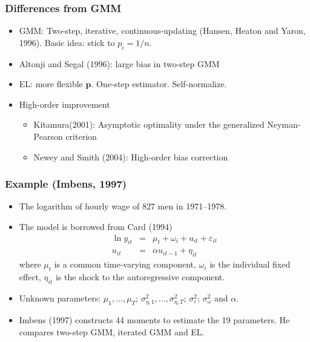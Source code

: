 \documentclass{beamer}
\begin{document}
\begin{frame}
\frametitle{Differences from GMM}
\begin{itemize}
\item GMM: Two-step,
iterative, continuous-updating (Hansen, Heaton and Yaron, 1996).
Basic idea: stick to \(p_i = 1/n\).
\item Altonji and Segal (1996): large bias in two-step GMM
\item EL: more flexible \(\mathbf{p}\). One-step estimator. Self-normalize. 
\item High-order improvement
\begin{itemize}
\item Kitamura(2001): Asymptotic optimality under the generalized Neyman-Pearson criterion
\item Newey and Smith (2004): High-order bias correction
\end{itemize}
\end{itemize}
\end{frame}



\begin{frame}
\frametitle{ Example (Imbens, 1997)}
\begin{itemize}
\item The logarithm of hourly wage of 827 men in 1971--1978.
\item The model is borrowed from Card (1994)
\begin{eqnarray*}
\ln y_{it} &= & \mu_t + \omega_i + u_{it} + \varepsilon_{it}\\
u_{it} & = & \alpha u_{it-1} + \eta_{it}
\end{eqnarray*}
where $\mu_t$ is a common time-varying component, \(\omega_i\) is the individual fixed effect, \(\eta_{it}\) is the shock to the autoregressive component. \item Unknown parameters: \(\mu_1,\ldots,\mu_T\); \(\sigma_{\eta,1}^2,\ldots,\sigma_{\eta,T}^2\);
\(\sigma_\varepsilon^2\); \(\sigma_\omega^2\) and \(\alpha\).
\item Imbens (1997) constructs 44 moments to estimate the 19 parameters. He compares two-step GMM, iterated GMM and EL.
\end{itemize}
\end{frame}
\end{document}
